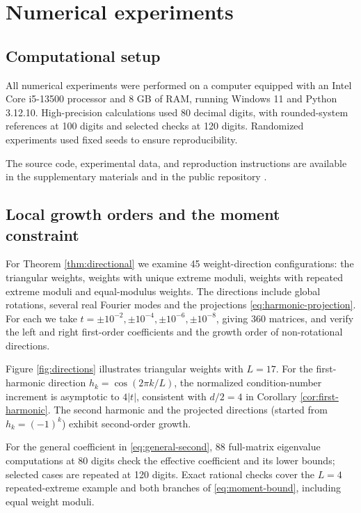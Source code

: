 \documentclass[10pt,twoside,final]{siamart1116}
\numberwithin{equation}{section}
\numberwithin{theorem}{section}
\begin{document}
\section{Numerical experiments}\label{sec:experiments}

\subsection{Computational setup}

All numerical experiments were performed on a computer equipped with an Intel
Core i5-13500 processor and 8 GB of RAM, running Windows 11 and Python 3.12.10.
High-precision calculations used 80 decimal
digits, with rounded-system references at 100 digits and selected checks at 120
digits. Randomized
experiments used fixed seeds to ensure reproducibility.

The source code, experimental data, and reproduction instructions are available
in the supplementary materials and in the public repository \cite{tang-data}.

\subsection{Local growth orders and the moment constraint}

For Theorem \ref{thm:directional} we examine 45 weight-direction configurations: the
triangular weights, weights with unique extreme moduli, weights with repeated extreme
moduli and equal-modulus weights. The directions include global rotations, several real
Fourier modes and the projections \eqref{eq:harmonic-projection}. For each we take
$t=\pm10^{-2},\pm10^{-4},\pm10^{-6},\pm10^{-8}$, giving 360 matrices, and verify the
left and right first-order coefficients and the growth order of non-rotational
directions.

Figure \ref{fig:directions} illustrates triangular weights with $L=17$. For the
first-harmonic direction $h_k=\cos(2\pi k/L)$, the normalized condition-number
increment is asymptotic to $4|t|$, consistent with $d/2=4$ in Corollary
\ref{cor:first-harmonic}. The second harmonic and the projected directions
(started from $h_k=(-1)^k$) exhibit second-order growth.

For the general coefficient in \eqref{eq:general-second}, 88 full-matrix
eigenvalue computations at 80 digits check the effective coefficient and its
lower bounds; selected cases are repeated at 120 digits. Exact rational checks
cover the $L=4$ repeated-extreme example and both branches of
\eqref{eq:moment-bound}, including equal weight moduli.
\end{document}
